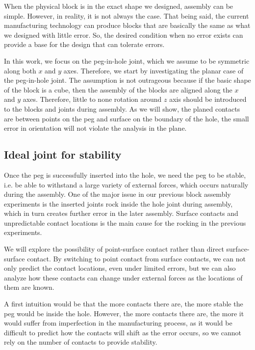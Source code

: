 \documentclass[11pt, twocolumn]{article}
\begin{document}
When the physical block is in the exact shape we designed, assembly can be simple. However, in reality, it is not always the case. That being said, the current manufacturing technology can produce blocks that are basically the same as what we designed with little error. So, the desired condition when no error exists can provide a base for the design that can tolerate errors. 

In this work, we focus on the peg-in-hole joint, which we assume to be symmetric along both $x$ and $y$ axes. Therefore, we start by investigating the planar case of the peg-in-hole joint. The assumption is not outrageous because if the basic shape of the block is a cube, then the assembly of the blocks are aligned along the $x$ and $y$ axes. Therefore, little to none rotation around $z$ axis should be introduced to the blocks and joints during assembly. As we will show, the planed contacts are between points on the peg and surface on the boundary of the hole, the small error in orientation will not violate the analysis in the plane. 


\subsection{Ideal joint for stability}

Once the peg is successfully inserted into the hole, we need the peg to be stable, i.e. be able to withstand a large variety of external forces, which occurs naturally during the assembly. One of the major issue in our previous block assembly experiments is the inserted joints rock inside the hole joint during assembly, which in turn creates further error in the later assembly. Surface contacts and unpredictable contact locations is the main cause for the rocking in the previous experiments. 

We will explore the possibility of point-surface contact rather than direct surface-surface contact. By switching to point contact from surface contacts, we can not only predict the contact locations, even under limited errors, but we can also analyze how these contacts can change under external forces as the locations of them are known. 

A first intuition would be that the more contacts there are, the more stable the peg would be inside the hole. However, the more contacts there are, the more it would suffer from imperfection in the manufacturing process, as it would be difficult to predict how the contacts will shift as the error occurs, so we cannot rely on the number of contacts to provide stability. 
\end{document}
